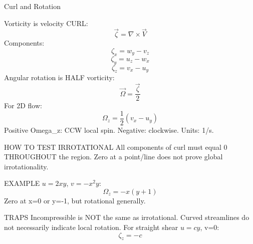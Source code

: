 Curl and Rotation

Vorticity is velocity CURL:
$$\vec\zeta=\nabla\times\vec V$$
Components:
$$\zeta_x=w_y-v_z$$
$$\zeta_y=u_z-w_x$$
$$\zeta_z=v_x-u_y$$
Angular rotation is HALF vorticity:
$$\vec\Omega=\frac{\vec\zeta}{2}$$
For 2D flow:
$$\Omega_z=\frac{1}{2}(v_x-u_y)$$
Positive Omega_z: CCW local spin.
Negative: clockwise.
Units: 1/s.

HOW TO TEST IRROTATIONAL
All components of curl must equal 0 THROUGHOUT the region. Zero at a point/line does not prove global irrotationality.

EXAMPLE
$u=2xy$, $v=-x^2y$:
$$\Omega_z=-x(y+1)$$
Zero at x=0 or y=-1, but rotational generally.

TRAPS
Incompressible is NOT the same as irrotational.
Curved streamlines do not necessarily indicate local rotation.
For straight shear $u=cy$, v=0:
$$\zeta_z=-c$$
